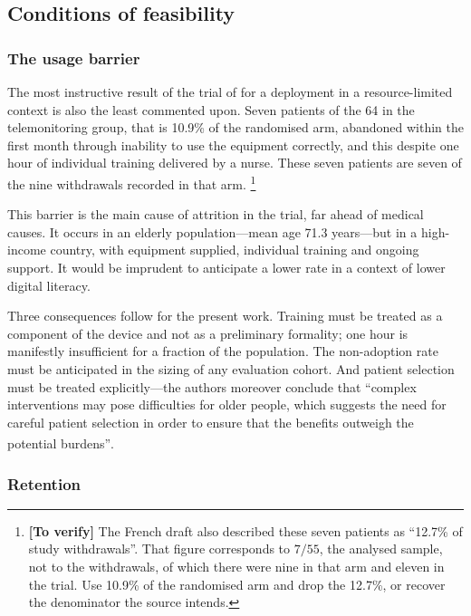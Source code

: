 \documentclass[12pt,a4paper,oneside]{report}
\newcommand{\verify}[1]{\footnote{\textbf{[To verify]} #1}}
\newcommand{\bq}[1]{``#1''\textsuperscript{\dag}}
\begin{document}
\subsection{Conditions of feasibility}\label{sec:feasibility}

\subsubsection{The usage barrier}

The most instructive result of the trial of \textcite{mihevc2025} for a deployment in a resource-limited context is also the least commented upon. Seven patients of the 64 in the telemonitoring group, that is 10.9\% of the randomised arm, abandoned within the first month through inability to use the equipment correctly, and this despite one hour of individual training delivered by a nurse. These seven patients are seven of the nine withdrawals recorded in that arm.%
\verify{The French draft also described these seven patients as ``12.7\% of study withdrawals''. That figure corresponds to $7/55$, the analysed sample, not to the withdrawals, of which there were nine in that arm and eleven in the trial. Use 10.9\% of the randomised arm and drop the 12.7\%, or recover the denominator the source intends.}

This barrier is the main cause of attrition in the trial, far ahead of medical causes. It occurs in an elderly population---mean age 71.3 years---but in a high-income country, with equipment supplied, individual training and ongoing support. It would be imprudent to anticipate a lower rate in a context of lower digital literacy.

Three consequences follow for the present work. Training must be treated as a component of the device and not as a preliminary formality; one hour is manifestly insufficient for a fraction of the population. The non-adoption rate must be anticipated in the sizing of any evaluation cohort. And patient selection must be treated explicitly---the authors moreover conclude that \bq{complex interventions may pose difficulties for older people, which suggests the need for careful patient selection in order to ensure that the benefits outweigh the potential burdens}.

\subsubsection{Retention}
\end{document}
